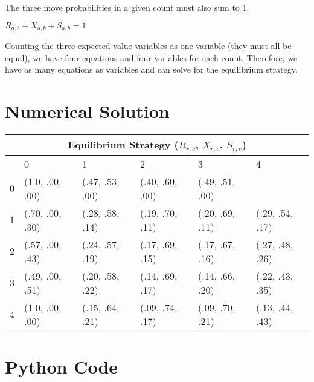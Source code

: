 \documentclass[11pt]{article}
\begin{document}
\begin{multicols}{2}
The three move probabilities in a given count must also sum to 1.

\begin{center}
	$R_{a,b} + X_{a,b} + S_{a,b} = 1$
\end{center}

Counting the three expected value variables as one variable (they must all be equal), we have four equations and four variables for each count. Therefore, we have as many equations as variables and can solve for the equilibrium strategy.

\end{multicols}

\appendix

\section{Numerical Solution}

\begin{center}
\def\arraystretch{1.5}
\begin{tabular}{|p{.5cm}||p{2.5cm}|p{2.5cm}|p{2.5cm}|p{2.5cm}|p{2.5cm}|}
 \hline
 \multicolumn{6}{|c|}{Equilibrium Strategy ($R_{r,c}$, $X_{r,c}$, $S_{r,c}$)} \\
 \hline
    & 0 & 1 & 2 & 3 & 4\\
 \hline
 0 &      (1.0, .00, .00) &    (.47, .53, .00)   &    (.40, .60, .00)   &    (.49, .51, .00)    & \\
 1 &      (.70, .00, .30) &    (.28, .58, .14)   &    (.19, .70, .11)   &    (.20, .69, .11)    & (.29, .54, .17)\\
 2 &      (.57, .00, .43) &    (.24, .57, .19)   &    (.17, .69, .15)   &    (.17, .67, .16)    & (.27, .48, .26)\\
 3 &      (.49, .00, .51) &    (.20, .58, .22)   &    (.14, .69, .17)   &    (.14, .66, .20)    & (.22, .43, .35)\\
 4 &      (1.0, .00, .00) &    (.15, .64, .21)   &    (.09, .74, .17)   &    (.09, .70, .21)    & (.13, .44, .43)\\
 \hline
\end{tabular}
\end{center}

\section{Python Code}
\end{document}
